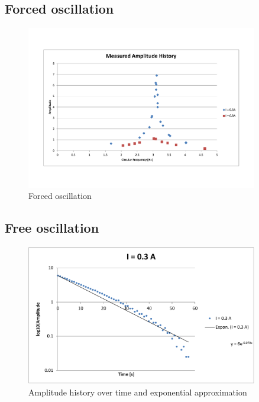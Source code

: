 \documentclass{scrreprt}
\begin{document}
\subsection{Forced oscillation}
\begin{figure}[H]
	\centering
  \includegraphics[width=0.9\textwidth]{diag/measurements_amplitudes.pdf}
	\caption{Forced oscillation}
	\label{fig:forcedoscillation}
\end{figure}

\subsection{Free oscillation}
\begin{figure}[H]
	\centering
  \includegraphics[width=0.9\textwidth]{diag/3A.pdf}
	\caption{Amplitude history over time and exponential approximation}
	\label{fig:0.3A}
\end{figure}
\end{document}
